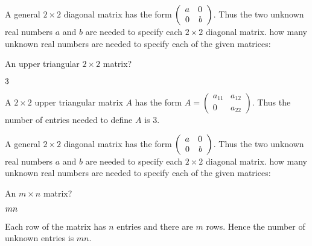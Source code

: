 \documentclass{ximera}
\begin{document}
\problemlabel

\noindent A general $2\times 2$ diagonal matrix has the form $\left(\begin{array}{rr} a & 0\\ 0 &b\end{array}\right)$.  Thus the two unknown real numbers $a$ and $b$ are needed to specify each $2\times 2$ diagonal matrix.  how many unknown real numbers are needed to specify each of the given matrices:

\begin{exercise}  \label{c1.3.1a}
An upper triangular $2\times 2$ matrix? \begin{prompt}$3$\end{prompt}

\begin{solution}
A $2\times 2$ upper triangular matrix $A$ has the form $A = \left( \begin{array}{cc}
            a_{11} & a_{12} \\
            0 & a_{22} \end{array} \right)$.  Thus the number of entries needed to define $A$ is $3$.  

\end{solution}
\end{exercise}





\problemlabel

\noindent A general $2\times 2$ diagonal matrix has the form $\left(\begin{array}{rr} a & 0\\ 0 &b\end{array}\right)$.  Thus the two unknown real numbers $a$ and $b$ are needed to specify each $2\times 2$ diagonal matrix.  how many unknown real numbers are needed to specify each of the given matrices:

\begin{exercise}  \label{c1.3.2}
An $m\times n$ matrix? \begin{prompt}$mn$\end{prompt}

\begin{solution}
Each row of the matrix has $n$ entries and there are $m$ rows.  Hence the number of unknown entries is $mn$.

\end{solution}
\end{exercise}





\problemlabel
\end{document}
